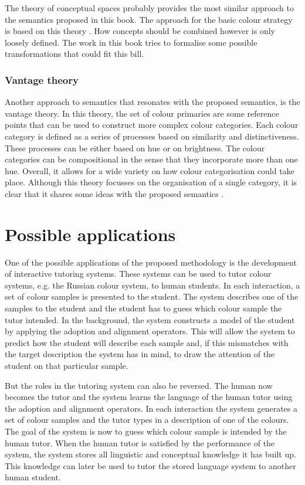 The theory of conceptual spaces probably provides the most similar
approach to the semantics proposed in this book. The approach for
the basic colour strategy is based on this theory
\citep{gardenfors04conceptual}. How concepts should be combined
however is only loosely defined. The work in this book tries to
formalise some possible transformations that could fit this bill.

\subsubsection{Vantage theory}

Another approach to semantics that resonates with the proposed
semantics, is the vantage theory. In this theory, the set of colour
primaries are some reference points that can be used to construct more
complex colour categories. Each colour category is defined as a series
of processes based on similarity and distinctiveness. These processes
can be either based on hue or on brightness. The colour categories can
be compositional in the sense that they incorporate more than one
hue. Overall, it allows for a wide variety on how colour
categorisation could take place. Although this theory focusses on the
organisation of a single category, it is clear that it shares some
ideas with the proposed semantics \citep{maclaury92brightness,
  maclaury02introducing}.

\section{Possible applications}
\label{s:possible-applications}

One of the possible applications of the proposed methodology is the
development of interactive tutoring systems. These systems can be used
to tutor colour systems, e.g. the Russian colour system,
to human students. In each interaction, a set of colour samples is
presented to the student. The system describes one of the samples to
the student and the student has to guess which colour sample the tutor
intended. In the background, the system constructs a model of the
student by applying the adoption and alignment operators. This will
allow the system to predict how the student will describe each sample
and, if this mismatches with the target description the system has in
mind, to draw the attention of the student on that particular sample.

But the roles in the tutoring system can also be reversed. The human
now becomes the tutor and the system learns the language of the human
tutor using the adoption and alignment operators. In each interaction
the system generates a set of colour samples and the tutor types in a
description of one of the colours. The goal of the system is now to
guess which colour sample is intended by the human tutor. When the
human tutor is satisfied by the performance of the system, the system
stores all linguistic and conceptual knowledge it has built up. This
knowledge can later be used to tutor the stored language system to
another human student.

